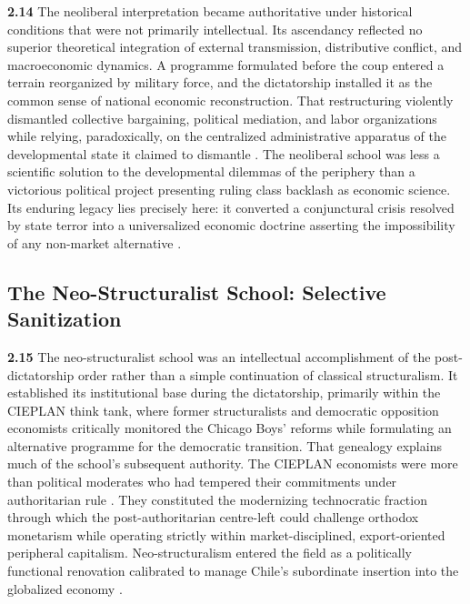 \textbf{2.14} The neoliberal interpretation became authoritative under historical conditions that were not 
primarily intellectual. Its ascendancy reflected no superior theoretical integration of external transmission, 
distributive conflict, and macroeconomic dynamics. A programme formulated before the coup entered a terrain 
reorganized by military force, and the dictatorship installed it as the common sense of national economic 
reconstruction. That restructuring violently dismantled collective bargaining, political mediation, and 
labor organizations while relying, paradoxically, on the centralized administrative apparatus of the developmental  state it claimed to dismantle \citep{Clark2017,Bockman2019}. The neoliberal school was less a scientific solution  to the developmental dilemmas of the periphery than a victorious political project presenting ruling class backlash as economic science. Its enduring legacy lies precisely here: it converted a conjunctural crisis resolved by state terror into a universalized economic doctrine asserting the impossibility of any non-market alternative \citep{Espinosa2021}.

\subsection{The Neo-Structuralist School: Selective Sanitization}
\label{sec:A3_neo_structuralism}

\textbf{2.15} The neo-structuralist school was an intellectual accomplishment of the post-dictatorship 
order rather than a simple continuation of classical structuralism. It established its institutional 
base during the dictatorship, primarily within the CIEPLAN think tank, where former structuralists and 
democratic opposition economists critically monitored the Chicago Boys' reforms while formulating an 
alternative programme for the democratic transition. That genealogy explains much of the school's 
subsequent authority. The CIEPLAN economists were more than political moderates who had tempered their 
commitments under authoritarian rule \citep{Silva1991}. They constituted the modernizing technocratic 
fraction through which the post-authoritarian centre-left could challenge orthodox monetarism while 
operating strictly within market-disciplined, export-oriented peripheral capitalism. 
Neo-structuralism entered the field as a politically functional renovation calibrated to manage Chile's 
subordinate insertion into the globalized economy \citep{Sklair2000,Leiva2008,Maillet2016}.

